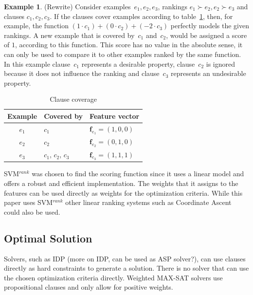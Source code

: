 \documentclass[letterpaper]{article}
\newcommand{\svm}{SVM$^{rank}$}
\theoremstyle{definition}
\newtheorem{example}{Example}
\newcommand{\sam}[1]{{\color{red}(#1)}}
\begin{document}
\begin{example} \sam{Rewrite}
  \label{ex:features}
  Consider examples~$e_1, e_2, e_3$, rankings $e_1 \succ e_2, e_2 \succ e_3$ and clauses $c_1, c_2, c_3$.
  If the clauses cover examples according to table~\ref{tbl:cover_examples}, then, for example, the function $(1 \cdot c_1) + (0\cdot c_2) + (-2\cdot c_3)$ perfectly models the given rankings.
  A new example that is covered by~$c_1$ and~$c_2$, would be assigned a score of $1$, according to this function.
  This score has no value in the absolute sense, it can only be used to compare it to other examples ranked by the same function.
  In this example clause~$c_1$ represents a desirable property, clause~$c_2$ is ignored because it does not influence the ranking and clause~$c_3$ represents an undesirable property.

  \begin{table}
  \caption{Clause coverage}
  \label{tbl:cover_examples}
  \begin{tabularx}{\linewidth}{c|l|X}
    \textbf{Example} & \textbf{Covered by} & \textbf{Feature vector}\\
    \toprule
    $e_1$             & $c_1$               & $\mathbf{f}_{e_1} = (1, 0, 0)$ \\
    $e_2$             & $c_2$               & $\mathbf{f}_{e_2} = (0, 1, 0)$ \\
    $e_3$             & $c_1$, $c_2$, $c_3$ & $\mathbf{f}_{e_3} = (1, 1, 1)$ \\
  \end{tabularx}
  \end{table}
\end{example}

\svm{} \cite{joachims2006training} was chosen to find the scoring function since it uses a linear model and offers a robust and efficient implementation.
The weights that it assigns to the features can be used directly as weights for the optimization criteria.
While this paper uses \svm{} other linear ranking systems such as Coordinate Ascent \cite{metzler2007linear} could also be used.

\subsection{Optimal Solution}
Solvers, such as IDP \sam{more on IDP, can be used as ASP solver?}, can use clauses directly as hard constraints to generate a solution.
There is no solver that can use the chosen optimization criteria directly.
Weighted MAX-SAT solvers use propositional clauses and only allow for positive weights.
\end{document}
